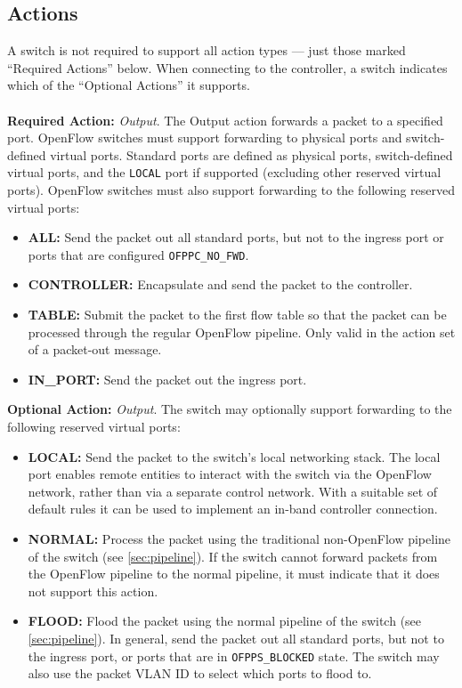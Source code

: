 \documentclass[10pt]{article}
\begin{document}
\subsection{Actions}
\label{ft:actions}
A switch is not required to support all action types --- just those marked ``Required Actions'' below. When connecting to the controller, a switch indicates which of the ``Optional Actions'' it supports.
\\\\
\textbf{Required Action:} \textit{Output}.
The Output action forwards a packet to a specified port. OpenFlow switches must support forwarding to physical ports and switch-defined virtual ports. Standard ports are defined as physical ports, switch-defined virtual ports, and the \verb|LOCAL| port if supported (excluding other reserved virtual ports). OpenFlow switches must also support forwarding to the following reserved virtual ports:
\begin{itemize}
\item \textbf{ALL:} Send the packet out all standard ports, but not to the ingress port or ports that are configured \verb|OFPPC_NO_FWD|.
\item \textbf{CONTROLLER:} Encapsulate and send the packet to the controller.
\item \textbf{TABLE:} Submit the packet to the first flow table so that the packet can be processed through the regular OpenFlow pipeline.  Only valid in the action set of a packet-out message.
\item \textbf{IN\_PORT:} Send the packet out the ingress port. 
\end{itemize}
\textbf{Optional Action:} \textit{Output}.
The switch may optionally support forwarding to the following reserved virtual ports:
\begin{itemize}
\item \textbf{LOCAL:} Send the packet to the switch's local networking stack. The local port enables remote entities to interact with the switch via the OpenFlow network, rather than via a separate control network. With a suitable set of default rules it can be used to implement an in-band controller connection.
\item \textbf{NORMAL:} Process the packet using the traditional non-OpenFlow pipeline of the switch (see \ref{sec:pipeline}). If the switch cannot forward packets from the OpenFlow pipeline to the normal pipeline, it must indicate that it does not support this action.
\item \textbf{FLOOD:} Flood the packet using the normal pipeline of the switch (see \ref{sec:pipeline}). In general, send the packet out all standard ports, but not to the ingress port, or ports that are in \verb|OFPPS_BLOCKED| state. The switch may also use the packet VLAN ID to select which ports to flood to.

\end{itemize}
\end{document}
